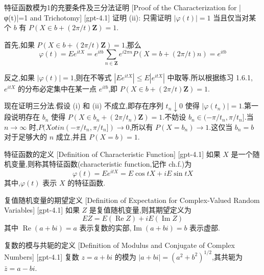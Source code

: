 \documentclass[UTF8]{ctexart}
\begin{document}
    \begin{prf}
        [Proof-of-the-Characterization-for-|φt|=1-and-Trichotomy]
        {特征函数模为1的充要条件及三分法证明}
        [Proof of the Characterization for |φ(t)|=1 and Trichotomy]
        [gpt-4.1]
        证明 (ii):
只需证明 $|\varphi(t)| = 1$ 当且仅当对某个 $b$ 有 $P(X \in b + (2\pi / t)\mathbf{Z}) = 1$.

首先,如果 $P(X \in b + (2\pi / t)\mathbf{Z}) = 1$,那么
\[
\varphi(t) = E e^{i t X} = e^{i t b} \sum_{n \in \mathbf{Z}} e^{i 2\pi n} P(X = b + (2\pi / t) n) = e^{i t b}
\]

反之,如果 $|\varphi(t)| = 1$,则在不等式 $|E e^{i t X}| \leq E|e^{i t X}|$ 中取等.所以根据练习 1.6.1,$e^{i t X}$ 的分布必定集中在某一点 $e^{i t b}$,即 $P(X \in b + (2\pi / t)\mathbf{Z}) = 1$.

现在证明三分法.假设 (i) 和 (ii) 不成立,即存在序列 $t_n \downarrow 0$ 使得 $|\varphi(t_n)| = 1$.第一段说明存在 $b_n$ 使得 $P(X \in b_n + (2\pi / t_n)\mathbf{Z}) = 1$.不妨设 $b_n \in (-\pi / t_n, \pi / t_n]$.当 $n \to \infty$ 时,$P(X 
otin (-\pi / t_n, \pi / t_n]) \to 0$,所以有 $P(X = b_n) \to 1$.这仅当 $b_n = b$ 对于足够大的 $n$ 成立,并且 $P(X = b) = 1$.

    \end{prf}
    
    
    
    \begin{dfn}
        {特征函数的定义}
        [Definition of Characteristic Function]
        [gpt-4.1]
        如果 $X$ 是一个随机变量,则称其特征函数(characteristic function,记作 ch.f.)为
\[
\varphi(t) = E e^{i t X} = E \cos t X + i E \sin t X
\]
其中,$\varphi(t)$ 表示 $X$ 的特征函数.
    \end{dfn}
    
    
    
    \begin{dfn}
        {复值随机变量的期望定义}
        [Definition of Expectation for Complex-Valued Random Variables]
        [gpt-4.1]
        如果 $Z$ 是复值随机变量,则其期望定义为
\[
E Z = E(\operatorname{Re} Z) + i E(\operatorname{Im} Z)
\]
其中 $\operatorname{Re}(a + b i) = a$ 表示复数的实部,$\operatorname{Im}(a + b i) = b$ 表示虚部.
    \end{dfn}
    
    
    
    \begin{dfn}
        {复数的模与共轭的定义}
        [Definition of Modulus and Conjugate of Complex Numbers]
        [gpt-4.1]
        复数 $z = a + b i$ 的模为 $|a + b i| = (a^{2} + b^{2})^{1/2}$,其共轭为 $\bar{z} = a - b i$.
    \end{dfn}
    
\end{document}

